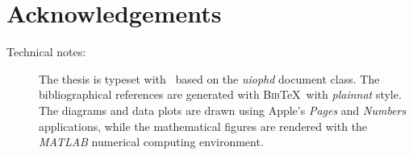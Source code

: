\chapter*{Acknowledgements}





\null
\vfill
\begin{description}
\item [Technical notes: ] The thesis is typeset with \LaTeXe \ based on the \textit{uiophd} document class. The bibliographical references are generated with \textsc{Bib}\negthinspace\TeX \ with \textit{plainnat} style. The diagrams and data plots are drawn using Apple's \textit{Pages} and \textit{Numbers} applications, while the mathematical figures are rendered with the \textit{MATLAB} numerical computing environment.
\end{description}
